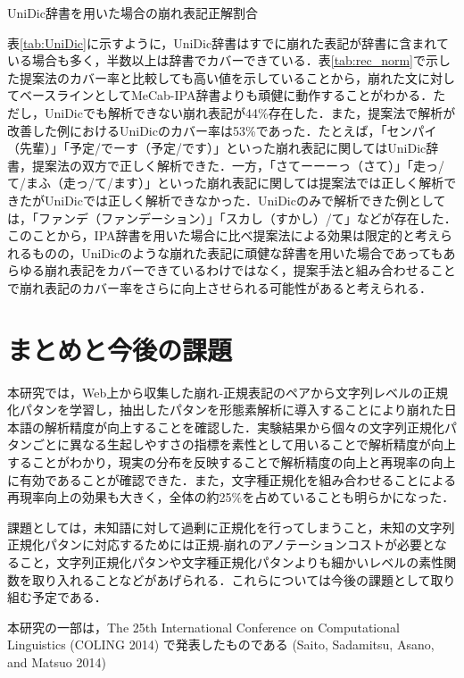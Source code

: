 \documentclass[japanese]{jnlp_1.4}
\begin{document}
\begin{table}[t]
\caption{UniDic辞書を用いた場合の崩れ表記正解割合}
\label{tab:UniDic}

\end{table}

表\ref{tab:UniDic}に示すように，UniDic辞書はすでに崩れた表記が辞書に含まれている場合も多く，半数以上は辞書でカバーできている．表\ref{tab:rec_norm}で示した提案法のカバー率と比較しても高い値を示していることから，崩れた文に対してベースラインとしてMeCab-IPA辞書よりも頑健に動作することがわかる．ただし，UniDicでも解析できない崩れ表記が44\%存在した．また，提案法で解析が改善した例におけるUniDicのカバー率は53\%であった．たとえば，「センパイ（先輩）」「予定/でーす（予定/です）」といった崩れ表記に関してはUniDic辞書，提案法の双方で正しく解析できた．一方，「さてーーーっ（さて）」「走っ/て/まふ（走っ/て/ます）」といった崩れ表記に関しては提案法では正しく解析できたがUniDicでは正しく解析できなかった．UniDicのみで解析できた例としては，「ファンデ（ファンデーション）」「スカし（すかし）/て」などが存在した．このことから，IPA辞書を用いた場合に比べ提案法による効果は限定的と考えられるものの，UniDicのような崩れた表記に頑健な辞書を用いた場合であってもあらゆる崩れ表記をカバーできているわけではなく，提案手法と組み合わせることで崩れ表記のカバー率をさらに向上させられる可能性があると考えられる．


\section{まとめと今後の課題}

本研究では，Web上から収集した崩れ‐正規表記のペアから文字列レベルの正規化パタンを学習し，抽出したパタンを形態素解析に導入することにより崩れた日本語の解析精度が向上することを確認した．実験結果から個々の文字列正規化パタンごとに異なる生起しやすさの指標を素性として用いることで解析精度が向上することがわかり，現実の分布を反映することで解析精度の向上と再現率の向上に有効であることが確認できた．また，文字種正規化を組み合わせることによる再現率向上の効果も大きく，全体の約25\%を占めていることも明らかになった．

課題としては，未知語に対して過剰に正規化を行ってしまうこと，未知の文字列正規化パタンに対応するためには正規‐崩れのアノテーションコストが必要となること，文字列正規化パタンや文字種正規化パタンよりも細かいレベルの素性関数を取り入れることなどがあげられる．これらについては今後の課題として取り組む予定である．


\acknowledgment
本研究の一部は，The 25th International Conference on Computational Linguistics (COLING 2014) で発表したものである (Saito, Sadamitsu, Asano, and Matsuo 2014)
\end{document}
